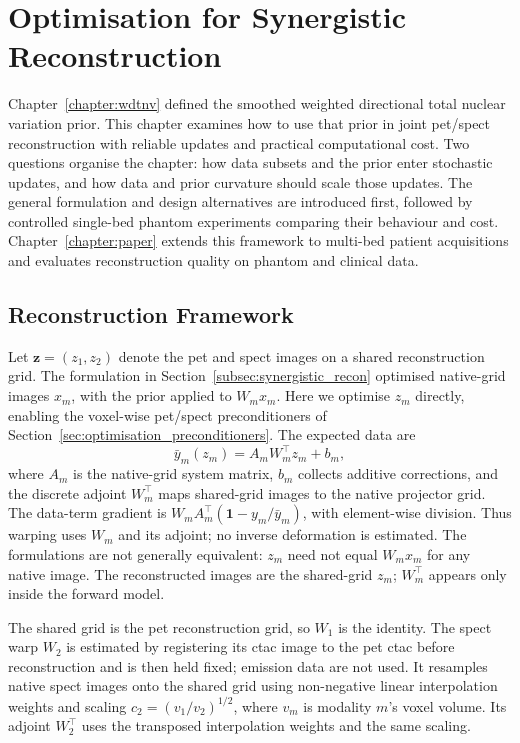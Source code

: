 \chapter{Optimisation for Synergistic Reconstruction}
\label{chapter:optimisation}

Chapter~\ref{chapter:wdtnv} defined the smoothed weighted directional total nuclear variation prior. This chapter examines how to use that prior in joint \gls{pet}/\gls{spect} reconstruction with reliable updates and practical computational cost. Two questions organise the chapter: how data subsets and the prior enter stochastic updates, and how data and prior curvature should scale those updates. The general formulation and design alternatives are introduced first, followed by controlled single-bed phantom experiments comparing their behaviour and cost. Chapter~\ref{chapter:paper} extends this framework to multi-bed patient acquisitions and evaluates reconstruction quality on phantom and clinical data.

\section{Reconstruction Framework}
\label{sec:optimisation_framework}

Let $\bm z=(z_1,z_2)$ denote the \gls{pet} and \gls{spect} images on a shared reconstruction grid. The formulation in Section~\ref{subsec:synergistic_recon} optimised native-grid images $x_m$, with the prior applied to $W_m x_m$. Here we optimise $z_m$ directly, enabling the voxel-wise \gls{pet}/\gls{spect} preconditioners of Section~\ref{sec:optimisation_preconditioners}. The expected data are
\begin{equation}
    \bar y_m(z_m)=A_m W_m^\top z_m+b_m,
    \label{eq:shared_grid_forward_model}
\end{equation}
where $A_m$ is the native-grid system matrix, $b_m$ collects additive corrections, and the discrete adjoint $W_m^\top$ maps shared-grid images to the native projector grid. The data-term gradient is $W_m A_m^\top(\bm 1-y_m/\bar y_m)$, with element-wise division. Thus warping uses $W_m$ and its adjoint; no inverse deformation is estimated. The formulations are not generally equivalent: $z_m$ need not equal $W_m x_m$ for any native image. The reconstructed images are the shared-grid $z_m$; $W_m^\top$ appears only inside the forward model.

The shared grid is the \gls{pet} reconstruction grid, so $W_1$ is the identity. The \gls{spect} warp $W_2$ is estimated by registering its \gls{ctac} image to the \gls{pet} \gls{ctac} before reconstruction and is then held fixed; emission data are not used. It resamples native \gls{spect} images onto the shared grid using non-negative linear interpolation weights and scaling $c_2=(v_1/v_2)^{1/2}$, where $v_m$ is modality $m$'s voxel volume. Its adjoint $W_2^\top$ uses the transposed interpolation weights and the same scaling.


